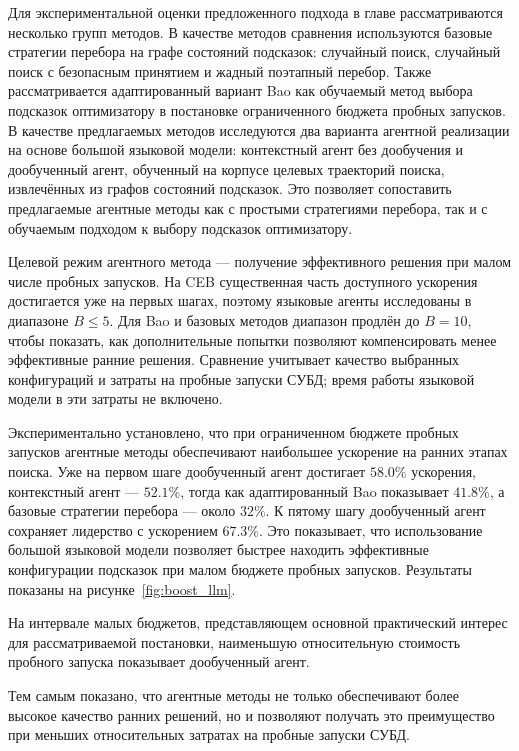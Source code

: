 Для экспериментальной оценки предложенного подхода в главе рассматриваются несколько групп методов. В качестве методов сравнения используются базовые стратегии перебора на графе состояний подсказок: случайный поиск, случайный поиск с безопасным принятием и жадный поэтапный перебор. Также рассматривается адаптированный вариант Bao как обучаемый метод выбора подсказок оптимизатору в постановке ограниченного бюджета пробных запусков. В качестве предлагаемых методов исследуются два варианта агентной реализации на основе большой языковой модели: контекстный агент без дообучения и дообученный агент, обученный на корпусе целевых траекторий поиска, извлечённых из графов состояний подсказок. Это позволяет сопоставить предлагаемые агентные методы как с простыми стратегиями перебора, так и с обучаемым подходом к выбору подсказок оптимизатору.

Целевой режим агентного метода --- получение эффективного решения при малом числе пробных запусков. На CEB существенная часть доступного ускорения достигается уже на первых шагах, поэтому языковые агенты исследованы в диапазоне \(B\leq5\). Для Bao и базовых методов диапазон продлён до \(B=10\), чтобы показать, как дополнительные попытки позволяют компенсировать менее эффективные ранние решения. Сравнение учитывает качество выбранных конфигураций и затраты на пробные запуски СУБД; время работы языковой модели в эти затраты не включено.

Экспериментально установлено, что при ограниченном бюджете пробных запусков агентные методы обеспечивают наибольшее ускорение на ранних этапах поиска. Уже на первом шаге дообученный агент достигает \(58.0\%\) ускорения, контекстный агент --- \(52.1\%\), тогда как адаптированный Bao показывает \(41.8\%\), а базовые стратегии перебора --- около \(32\%\). К пятому шагу дообученный агент сохраняет лидерство с ускорением \(67.3\%\). Это показывает, что использование большой языковой модели позволяет быстрее находить эффективные конфигурации подсказок при малом бюджете пробных запусков. Результаты показаны на рисунке~\ref{fig:boost_llm}.

На интервале малых бюджетов, представляющем основной практический интерес для рассматриваемой постановки, наименьшую относительную стоимость пробного запуска показывает дообученный агент.


Тем самым показано, что агентные методы не только обеспечивают более высокое качество ранних решений, но и позволяют получать это преимущество при меньших относительных затратах на пробные запуски СУБД.

